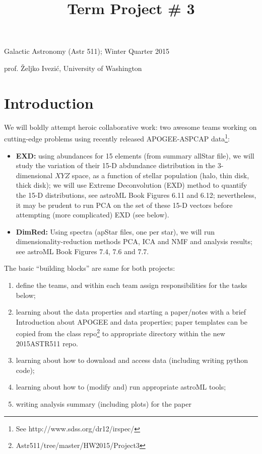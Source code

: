 \documentclass[12pt,preprint]{aastex}
\begin{document}
\title{ {\bf Term Project \# 3}}  
                   
Galactic Astronomy (Astr 511); Winter Quarter 2015

prof. \v{Z}eljko Ivezi\'{c}, University of Washington


\section{Introduction} 

We will boldly attempt heroic collaborative work: two awesome teams working on
cutting-edge problems using recently released APOGEE-ASPCAP 
data\footnote{See http://www.sdss.org/dr12/irspec/}:
\begin{itemize} 
\item {\bf EXD:} using abundances for 15 elements (from summary allStar file), we will study the 
variation of their 15-D abdundance distribution in the 3-dimensional $XYZ$ space, as a function 
of stellar population (halo, thin disk, thick disk); we will use Extreme Deconvolution (EXD) method to 
quantify the 15-D distributions, see astroML Book Figures 6.11 and 6.12; nevertheless, it may be
prudent to run PCA on the set of these 15-D vectors before attempting (more complicated) EXD (see
below). 
\item {\bf DimRed:} Using spectra (apStar files, one per star), we will run dimensionality-reduction
methods PCA, ICA and NMF and analysis results; see astroML Book Figures 7.4, 7.6 and 7.7. 
\end{itemize}    

The basic ``building blocks'' are same for both projects: 
\begin{enumerate}
\item define the teams, and within each team assign responsibilities for the tasks below; 
\item learning about the data properties and starting a paper/notes with a brief Introduction 
about APOGEE and data properties;  paper templates can be copied from the class 
repo\footnote{Astr511/tree/master/HW2015/Project3} to  appropriate directory within the 
new 2015ASTR511 repo. 
\item learning about how to download and access data (including writing python code);  
\item learning about how to (modify and) run appropriate astroML tools; 
\item writing analysis summary (including plots) for the paper 
\end{enumerate}
\end{document}
